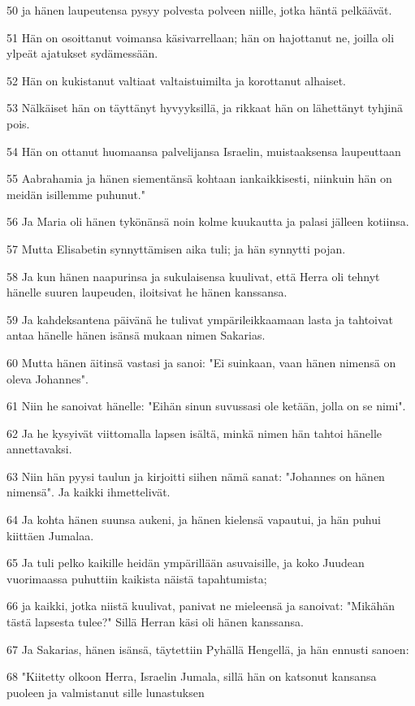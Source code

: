 \par 50 ja hänen laupeutensa pysyy polvesta polveen niille, jotka häntä pelkäävät.
\par 51 Hän on osoittanut voimansa käsivarrellaan; hän on hajottanut ne, joilla oli ylpeät ajatukset sydämessään.
\par 52 Hän on kukistanut valtiaat valtaistuimilta ja korottanut alhaiset.
\par 53 Nälkäiset hän on täyttänyt hyvyyksillä, ja rikkaat hän on lähettänyt tyhjinä pois.
\par 54 Hän on ottanut huomaansa palvelijansa Israelin, muistaaksensa laupeuttaan
\par 55 Aabrahamia ja hänen siementänsä kohtaan iankaikkisesti, niinkuin hän on meidän isillemme puhunut."
\par 56 Ja Maria oli hänen tykönänsä noin kolme kuukautta ja palasi jälleen kotiinsa.
\par 57 Mutta Elisabetin synnyttämisen aika tuli; ja hän synnytti pojan.
\par 58 Ja kun hänen naapurinsa ja sukulaisensa kuulivat, että Herra oli tehnyt hänelle suuren laupeuden, iloitsivat he hänen kanssansa.
\par 59 Ja kahdeksantena päivänä he tulivat ympärileikkaamaan lasta ja tahtoivat antaa hänelle hänen isänsä mukaan nimen Sakarias.
\par 60 Mutta hänen äitinsä vastasi ja sanoi: "Ei suinkaan, vaan hänen nimensä on oleva Johannes".
\par 61 Niin he sanoivat hänelle: "Eihän sinun suvussasi ole ketään, jolla on se nimi".
\par 62 Ja he kysyivät viittomalla lapsen isältä, minkä nimen hän tahtoi hänelle annettavaksi.
\par 63 Niin hän pyysi taulun ja kirjoitti siihen nämä sanat: "Johannes on hänen nimensä". Ja kaikki ihmettelivät.
\par 64 Ja kohta hänen suunsa aukeni, ja hänen kielensä vapautui, ja hän puhui kiittäen Jumalaa.
\par 65 Ja tuli pelko kaikille heidän ympärillään asuvaisille, ja koko Juudean vuorimaassa puhuttiin kaikista näistä tapahtumista;
\par 66 ja kaikki, jotka niistä kuulivat, panivat ne mieleensä ja sanoivat: "Mikähän tästä lapsesta tulee?" Sillä Herran käsi oli hänen kanssansa.
\par 67 Ja Sakarias, hänen isänsä, täytettiin Pyhällä Hengellä, ja hän ennusti sanoen:
\par 68 "Kiitetty olkoon Herra, Israelin Jumala, sillä hän on katsonut kansansa puoleen ja valmistanut sille lunastuksen

